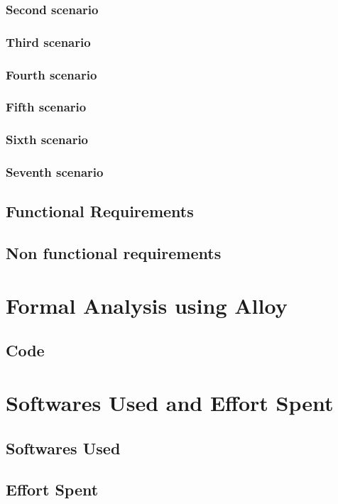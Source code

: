 \documentclass[12pt]{article}
\begin{document}
	\subsubsection{Second scenario}
	
	\FloatBarrier
	\clearpage
	\subsubsection{Third scenario}
	
	\FloatBarrier
	\clearpage
	\subsubsection{Fourth scenario}
	
	\FloatBarrier
	\clearpage
	\subsubsection{Fifth scenario}
	
	\FloatBarrier
	\clearpage
	\subsubsection{Sixth scenario}
	
	\FloatBarrier
	\clearpage
	\subsubsection{Seventh scenario}
	
	\FloatBarrier
	\clearpage
	\subsection{Functional Requirements}
	
	\subsection{Non functional requirements}
	

	\clearpage
	\section{Formal Analysis using Alloy}
	
	\subsection{Code}
	
	
	\clearpage
	\section{Softwares Used and Effort Spent}
	\subsection{Softwares Used}
	
	\subsection{Effort Spent}
	
\end{document}

